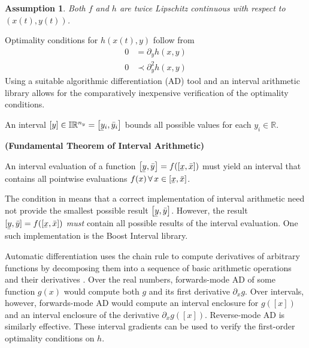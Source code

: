 \documentclass[twoside,leqno, twocolumn]{article}
\newcommand{\bbR}{\ensuremath{\mathbb{R}}}
\newcommand{\bbI}{\ensuremath{\mathbb{I}}}
\newcommand\ubar[1]{\underaccent{\bar}{#1}}
\newtheorem{assumption}{Assumption}[section]
\begin{document}
\begin{assumption} 
	\label{assume:twice-lipschitz}
	Both $f$ and $h$ are twice Lipschitz continuous with respect to $(x(t), y(t))$.
\end{assumption}
Optimality conditions for $h(x(t), y)$ follow from 
\begin{equation}
	\label{eq:optimality-conditions}
	\begin{aligned}
		0 &= \partial_yh(x, y)\\
		0 &\prec\partial^2_{y}h(x, y)
	\end{aligned}
\end{equation}
Using a suitable algorithmic differentiation (AD) tool and an interval arithmetic library allows for the comparatively inexpensive verification of the optimality conditions\cite{rallGlobalOptimizationUsing1985}. 

An interval $[y] \in \bbI\bbR^{n_y} = \left[\ubar y_i, \bar y_i\right]$ bounds all possible values for each $y_i\in\bbR$. 
\begin{Definition}
	\label{def:interval-arith}
	\textbf{(Fundamental Theorem of Interval Arithmetic)}
	
	An interval evaluation of a function $\left[\ubar{y},\bar{y}\right] = f(\left[\ubar x, \bar x\right])$ must yield an interval that contains all pointwise evaluations $f(x)\,\forall\,x\in\left[\ubar x, \bar x\right]$.
\end{Definition}
The condition in  means that a correct implementation of interval arithmetic need not provide the smallest possible result $\left[\ubar y, \bar y\right]$\cite{hickeyIntervalArithmeticPrinciples2001}. However, the result $[\ubar y, \bar y] = f(\left[\ubar x, \bar x\right])$ \textit{must} contain all possible results of the interval evaluation. One such implementation is the Boost Interval library\cite{melquiondBoostIntervalLibrary2022}.

Automatic differentiation uses the chain rule to compute derivatives of arbitrary functions by decomposing them into a sequence of basic arithmetic operations and their derivatives \cite{griewankEvaluatingDerivativesPrinciples2008}. Over the real numbers, forwards-mode AD of some function $g(x)$ would compute both $g$ and its first derivative $\partial_x g$. Over intervals, however, forwards-mode AD would compute an interval enclosure for $g(\left[x\right])$ and an interval enclosure of the derivative $\partial_xg(\left[x\right])$\cite{rallGlobalOptimizationUsing1985}. Reverse-mode AD is similarly effective. These interval gradients can be used to verify the first-order optimality conditions on $h$.
\end{document}
